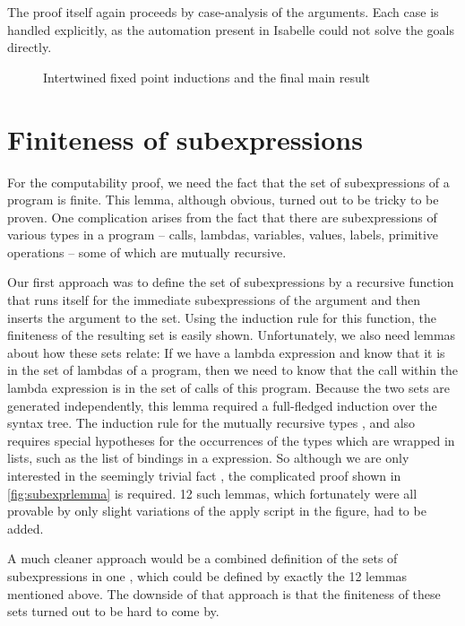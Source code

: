 \documentclass[a4paper,halfparskip,DIV=10,11pt]{scrbook}
\begin{document}
The proof itself again proceeds by case-analysis of the arguments. Each case is handled explicitly, as the automation present in Isabelle could not solve the goals directly.
 
\begin{figure}
\begin{framed}

\end{framed}
\caption{Intertwined fixed point inductions and the final main result}
\label{fig:intertwined}
\end{figure}

\section{Finiteness of subexpressions}

For the computability proof, we need the fact that the set of subexpressions of a program is finite. This lemma, although obvious, turned out to be tricky to be proven. One complication arises from the fact that there are subexpressions of various types in a program – calls, lambdas, variables, values, labels, primitive operations – some of which are mutually recursive.

Our first approach was to define the set of subexpressions by a recursive function that runs itself for the immediate subexpressions of the argument and then inserts the argument to the set. Using the induction rule for this function, the finiteness of the resulting set is easily shown. Unfortunately, we also need lemmas about how these sets relate: If we have a lambda expression and know that it is in the set of lambdas of a program, then we need to know that the call within the lambda expression is in the set of calls of this program. Because the two sets are generated independently, this lemma required a full-fledged induction over the syntax tree. The induction rule for the mutually recursive types ,  and  also requires special hypotheses for the occurrences of the types which are wrapped in lists, such as the list of bindings in a  expression. So although we are only interested in the seemingly trivial fact , the complicated proof shown in \vref{fig:subexprlemma} is required. 12 such lemmas, which fortunately were all provable by only slight variations of the apply script in the figure, had to be added.

A much cleaner approach would be a combined definition of the sets of subexpressions in one , which could be defined by exactly the 12 lemmas mentioned above. The downside of that approach is that the finiteness of these sets turned out to be hard to come by.
\end{document}
